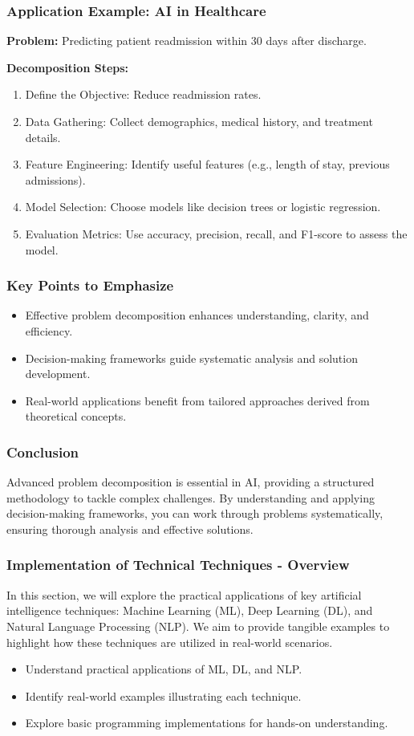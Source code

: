 \documentclass[aspectratio=169]{beamer}
\begin{document}
\begin{frame}[fragile]
    \frametitle{Application Example: AI in Healthcare}
    \textbf{Problem:} Predicting patient readmission within 30 days after discharge.
    
    \textbf{Decomposition Steps:}
    \begin{enumerate}
        \item Define the Objective: Reduce readmission rates.
        \item Data Gathering: Collect demographics, medical history, and treatment details.
        \item Feature Engineering: Identify useful features (e.g., length of stay, previous admissions).
        \item Model Selection: Choose models like decision trees or logistic regression.
        \item Evaluation Metrics: Use accuracy, precision, recall, and F1-score to assess the model.
    \end{enumerate}
\end{frame}

\begin{frame}[fragile]
    \frametitle{Key Points to Emphasize}
    \begin{itemize}
        \item Effective problem decomposition enhances understanding, clarity, and efficiency.
        \item Decision-making frameworks guide systematic analysis and solution development.
        \item Real-world applications benefit from tailored approaches derived from theoretical concepts.
    \end{itemize}
\end{frame}

\begin{frame}[fragile]
    \frametitle{Conclusion}
    Advanced problem decomposition is essential in AI, providing a structured methodology to tackle complex challenges. By understanding and applying decision-making frameworks, you can work through problems systematically, ensuring thorough analysis and effective solutions.
\end{frame}

\begin{frame}[fragile]
    \frametitle{Implementation of Technical Techniques - Overview}
    In this section, we will explore the practical applications of key artificial intelligence techniques: 
    Machine Learning (ML), Deep Learning (DL), and Natural Language Processing (NLP). 
    We aim to provide tangible examples to highlight how these techniques are utilized in real-world scenarios.
    
    \begin{itemize}
        \item Understand practical applications of ML, DL, and NLP.
        \item Identify real-world examples illustrating each technique.
        \item Explore basic programming implementations for hands-on understanding.
    \end{itemize}
\end{frame}
\end{document}
